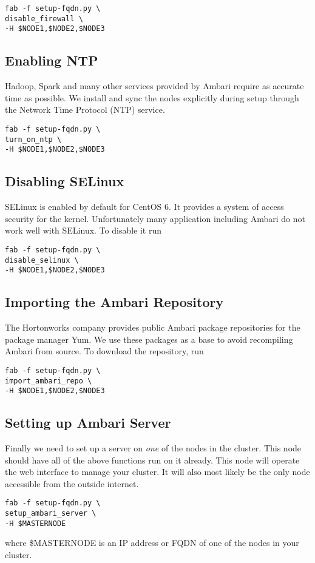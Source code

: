 \documentclass[9pt,twocolumn,twoside]{idsi}
\begin{document}
\begin{verbatim}
fab -f setup-fqdn.py \
disable_firewall \
-H $NODE1,$NODE2,$NODE3
\end{verbatim}


\subsection{Enabling NTP}
Hadoop, Spark and many other services provided by Ambari require as accurate time as possible. We install and sync the nodes explicitly during setup through the Network Time Protocol (NTP) service. 

\begin{verbatim}
fab -f setup-fqdn.py \
turn_on_ntp \
-H $NODE1,$NODE2,$NODE3
\end{verbatim}


\subsection{Disabling SELinux}
SELinux is enabled by default for CentOS 6. It provides a system of access security for the kernel. Unfortunately many application including Ambari do not work well with SELinux. To disable it run

\begin{verbatim}
fab -f setup-fqdn.py \
disable_selinux \
-H $NODE1,$NODE2,$NODE3
\end{verbatim}

\subsection{Importing the Ambari Repository}
The Hortonworks company provides public Ambari package repositories for the package manager Yum. We use these packages as a base to avoid recompiling Ambari from source. To download the repository, run

\begin{verbatim}
fab -f setup-fqdn.py \
import_ambari_repo \
-H $NODE1,$NODE2,$NODE3
\end{verbatim}

\subsection{Setting up Ambari Server}

Finally we need to set up a server on \emph{one} of the nodes in the cluster. This node should have all of the above functions run on it already. This node will operate the web interface to manage your cluster. It will also most likely be the only node accessible from the outside internet.

\begin{verbatim}
fab -f setup-fqdn.py \
setup_ambari_server \
-H $MASTERNODE
\end{verbatim}

where \$MASTERNODE is an IP address or FQDN of one of the nodes in your cluster.
\end{document}
